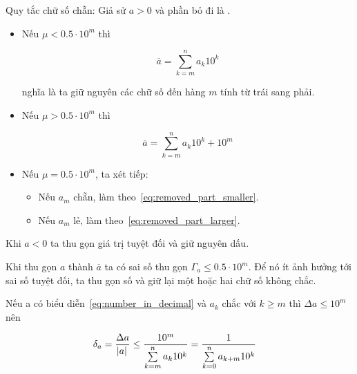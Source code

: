 \documentclass[../../Lectures.tex]{subfiles}
\begin{document}
\begin{rule_of_thumb}
Quy tắc chữ số chẵn: Giả sử \(a > 0\) và phần bỏ đi là \mu.

\begin{itemize}
    \item Nếu \(\mu < \num{0.5} \cdot 10^m\) thì

        \begin{equation}\label{eq:removed_part_smaller}
            \overline{a} = \sum_{k=m}^{n} a_k 10^k
        \end{equation}

        nghĩa là ta giữ nguyên các chữ số đến hàng \(m\) tính từ trái sang phải.

    \item Nếu \(\mu > \num{0.5} \cdot 10^m\) thì

        \begin{equation}\label{eq:removed_part_larger}
            \overline{a} = \sum_{k=m}^{n} a_k 10^k + 10^m
        \end{equation}

    \item Nếu \(\mu = \num{0.5} \cdot 10^m\), ta xét tiếp:

        \begin{itemize}
            \item Nếu \(a_m\) chẵn, làm theo~\ref{eq:removed_part_smaller}.
            \item Nếu \(a_m\) lẻ, làm theo~\ref{eq:removed_part_larger}.
        \end{itemize}
\end{itemize}

Khi \(a < 0\) ta thu gọn giá trị tuyệt đối và giữ nguyên dấu.
\end{rule_of_thumb}

Khi thu gọn \(a\) thành \(\overline{a}\) ta có sai số thu gọn \(\Gamma_a \leq
\num{0.5} \cdot 10^m\). Để nó ít ảnh hưởng tới sai số tuyệt đối, ta thu gọn số
và giữ lại một hoặc hai chữ số không chắc.

Nếu a có biểu diễn~\ref{eq:number_in_decimal} và \(a_k\) chắc với \(k \geq m\)
thì \(\Delta a \leq 10^m\) nên

\begin{align*}
    \delta_a = \frac{\Delta a}{\abs{a}} \leq \frac{10^m}{\sum\limits_{k=m}\limits^{n} a_k 10^k} &= \frac{1}{\sum\limits_{k=0}\limits^{n} a_{k+m} 10^k}
\end{align*}
\end{document}
